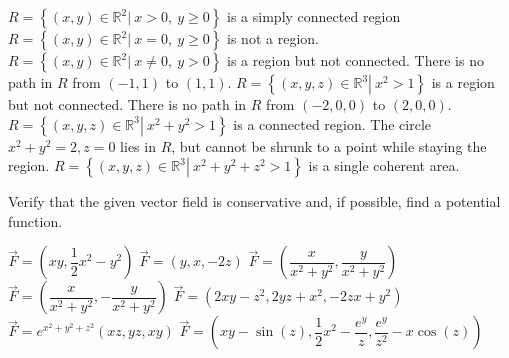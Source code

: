 \begin{Answer}
    
        \Question $R = \left\{ (x,y) \in \mathbb{R}^2 \left| \ x > 0, \ y \geq 0  \right. \right\}$ is a simply connected region
        \Question $R = \left\{ (x,y) \in \mathbb{R}^2 \left| \ x = 0, \ y \geq 0  \right. \right\}$ is not a region.
        \Question $R = \left\{ (x,y) \in \mathbb{R}^2 \left| \ x \neq 0, \ y > 0  \right. \right\}$ is a region but not connected. There is no path in $R$ from $(-1,1)$ to $(1,1)$.
        \Question $R = \left\{ (x,y,z) \in \mathbb{R}^3 \left| \ x^2 > 1  \right. \right\}$ is a region but not connected. There is no path in $R$ from $(-2,0,0)$ to $(2,0,0)$.
        \Question $R = \left\{ (x,y,z) \in \mathbb{R}^3 \left| \ x^2 + y^2 > 1  \right. \right\}$ is a connected region. The circle $x^2+y^2=2, z=0$ lies in $R$, but cannot be shrunk to a point while staying the region. 
        \Question $R = \left\{ (x,y,z) \in \mathbb{R}^3 \left| \ x^2 + y^2 + z^2 > 1  \right. \right\}$ is a single coherent area.
    
\end{Answer}

\begin{Exercise} Verify that the given vector field is conservative and, if possible, find a potential function.
    \begin{multicols}{2}
     \Question[difficulty = 2] $\vec F = \left(xy, \dfrac{1}{2}x^2-y^2 \right)$ 
        \Question[difficulty = 1] $\vec F = \left(y, x, -2z \right)$ 
        \Question[difficulty = 2] $\vec F = \left( \dfrac{x}{x^2+y^2}, \dfrac{y}{x^2+y^2} \right)$
        \Question[difficulty = 1] $\vec F = \left( \dfrac{x}{x^2+y^2}, -\dfrac{y}{x^2+y^2} \right)$ 
        \Question[difficulty = 1] $\vec F = \left( 2xy-z^2, 2yz+x^2, -2zx+y^2\right)$ 
        \Question[difficulty = 3] $\vec F = e^{x^2+y^2+z^2}\left( xz, yz, xy\right)$ 
        \Question[difficulty = 3] $\vec F = \left( xy - \sin (z), \dfrac{1}{2}x^2 - \dfrac{e^y}{z}, \dfrac{e^y}{z^2} - x \cos (z)\right)$ 
        \EndCurrentQuestion
\end{multicols}
\end{Exercise}

